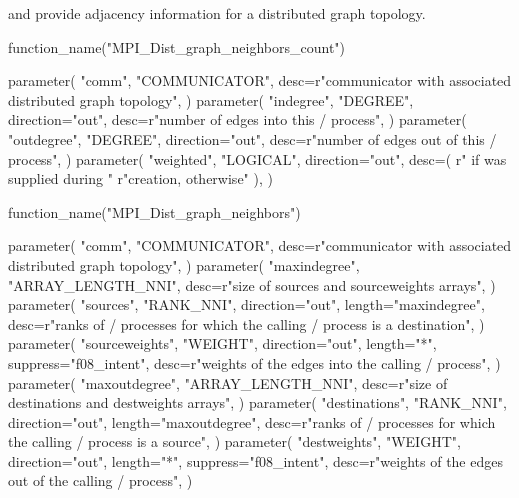  and  
provide adjacency information for a distributed graph topology.

\begin{mpi-binding}
    function_name("MPI_Dist_graph_neighbors_count")
    
    parameter(
        "comm",
        "COMMUNICATOR",
        desc=r"communicator with associated distributed graph topology",
    )
    parameter(
        "indegree",
        "DEGREE",
        direction="out",
        desc=r"number of edges into this \MPI/ process",
    )
    parameter(
        "outdegree",
        "DEGREE",
        direction="out",
        desc=r"number of edges out of this \MPI/ process",
    )
    parameter(
        "weighted",
        "LOGICAL",
        direction="out",
        desc=(
            r" if  was supplied during "
            r"creation,  otherwise"
        ),
    )
\end{mpi-binding}

\begin{mpi-binding}
    function_name("MPI_Dist_graph_neighbors")
    
    parameter(
        "comm",
        "COMMUNICATOR",
        desc=r"communicator with associated distributed graph topology",
    )
    parameter(
        "maxindegree",
        "ARRAY_LENGTH_NNI",
        desc=r"size of sources and sourceweights arrays",
    )
    parameter(
        "sources",
        "RANK_NNI",
        direction="out",
        length="maxindegree",
        desc=r"ranks of \MPI/ processes for which the calling \MPI/ process is a destination",
    )
    parameter(
        "sourceweights",
        "WEIGHT",
        direction="out",
        length="*",
        suppress="f08_intent",
        desc=r"weights of the edges into the calling \MPI/ process",
    )
    parameter(
        "maxoutdegree",
        "ARRAY_LENGTH_NNI",
        desc=r"size of destinations and destweights arrays",
    )
    parameter(
        "destinations",
        "RANK_NNI",
        direction="out",
        length="maxoutdegree",
        desc=r"ranks of \MPI/ processes for which the calling \MPI/ process is a source",
    )
    parameter(
        "destweights",
        "WEIGHT",
        direction="out",
        length="*",
        suppress="f08_intent",
        desc=r"weights of the edges out of the calling \MPI/ process",
    )
\end{mpi-binding}

